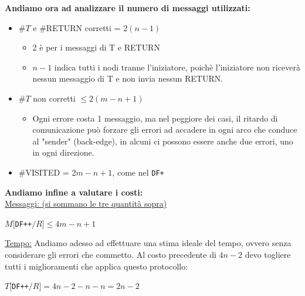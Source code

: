 \textbf{Andiamo ora ad analizzare il numero di messaggi utilizzati:}
\begin{itemize}
    \item \#$T$ e \#RETURN corretti = $2(n-1)$
          \begin{itemize}
              \item 2 è per i messaggi di T e RETURN
              \item $n-1$ indica tutti i nodi tranne l'iniziatore, poichè
                    l'iniziatore non riceverà nessun messaggio di T e non invia nessun
                    RETURN.
          \end{itemize}
    \item \#$T$ non corretti $\leq 2(m-n+1)$
          \begin{itemize}
              \item Ogni errore costa 1 messaggio, ma nel peggiore dei casi, il
                    ritardo di comunicazione può forzare gli errori ad accadere in ogni
                    arco che conduce al "sender" (back-edge), in alcuni ci possono essere
                    anche due errori, uno in ogni direzione.


          \end{itemize}

    \item \#VISITED = $2m - n + 1$, come nel \texttt{DF+}

\end{itemize}

\textbf{Andiamo infine a valutare i costi: }\\
\underline{Messaggi: (si sommano le tre quantità sopra)}
\begin{center}
    $M[$\texttt{DF++}$/R] \leq 4m - n + 1$
\end{center}

\underline{Tempo:}
Andiamo adesso ad effettuare una stima ideale del tempo, ovvero senza
considerare gli errori che commetto. Al costo precedente di $4n-2$ devo togliere
tutti i miglioramenti che applica questo protocollo:
\begin{center}
    $T[$\texttt{DF++}$/R] = 4n - 2 - n - n = 2n - 2$
\end{center}

